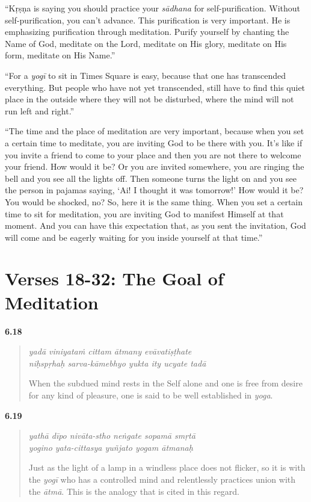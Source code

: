 \enquote{Kṛṣṇa is saying you should practice your \textit{sādhana} for self-purification. Without self-purification, you can’t advance. This purification is very important. He is emphasizing purification through meditation. Purify yourself by chanting the Name of God, meditate on the Lord, meditate on His glory, meditate on His form, meditate on His Name.}

\enquote{For a \textit{yogī} to sit in Times Square is easy, because that one has transcended everything. But people who have not yet transcended, still have to find this quiet place in the outside where they will not be disturbed, where the mind will not run left and right.}

\enquote{The time and the place of meditation are very important, because when you set a certain time to meditate, you are inviting God to be there with you. It’s like if you invite a friend to come to your place and then you are not there to welcome your friend. How would it be? Or you are invited somewhere, you are ringing the bell and you see all the lights off. Then someone turns the light on and you see the person in pajamas saying, \enquote{Ai! I thought it was tomorrow!} How would it be? You would be shocked, no? So, here it is the same thing. When you set a certain time to sit for meditation, you are inviting God to manifest Himself at that moment. And you can have this expectation that, as you sent the invitation, God will come and be eagerly waiting for you inside yourself at that time.}

\section{Verses 18-32: The Goal of Meditation}\label{sec-verses-18-32-the-goal-of-meditation}


\par\noindent\textbf{6.18}\par
\begin{verse}
\textit{yadā viniyataṁ cittam ātmany evāvatiṣṭhate} \\
\textit{niḥspṛhaḥ sarva-kāmebhyo yukta ity ucyate tadā}

\noindent When the subdued mind rests in the Self alone and one is free from desire for any kind of pleasure, one is said to be well established in \textit{yoga}.
\end{verse}
\par



\par\noindent\textbf{6.19}\par
\begin{verse}
\textit{yathā dīpo nivāta-stho neṅgate sopamā smṛtā} \\
\textit{yogino yata-cittasya yuñjato yogam ātmanaḥ}

\noindent Just as the light of a lamp in a windless place does not flicker, so it is with the \textit{yogī} who has a controlled mind and relentlessly practices union with the \textit{ātmā}. This is the analogy that is cited in this regard.
\end{verse}
\par



